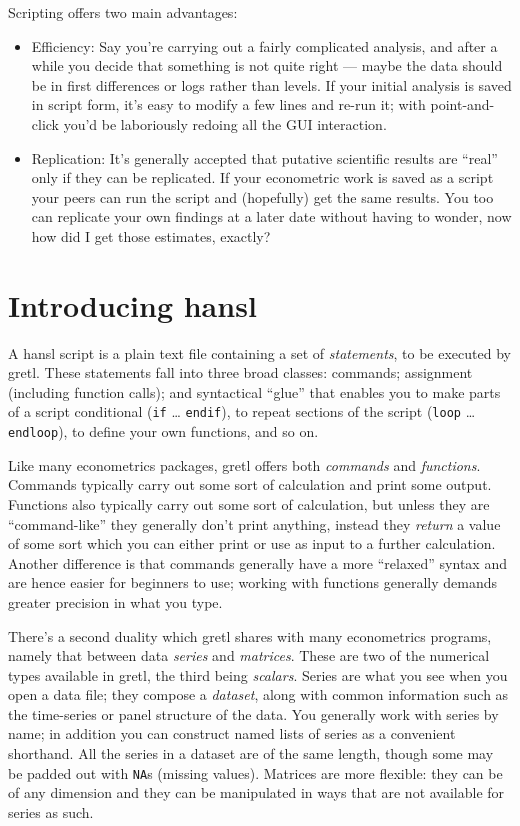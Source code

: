 Scripting offers two main advantages:

\begin{itemize}
\item Efficiency: Say you're carrying out a fairly complicated
  analysis, and after a while you decide that something is not quite
  right --- maybe the data should be in first differences or logs
  rather than levels. If your initial analysis is saved in script
  form, it's easy to modify a few lines and re-run it; with
  point-and-click you'd be laboriously redoing all the GUI
  interaction.
\item Replication: It's generally accepted that putative scientific
  results are ``real'' only if they can be replicated.  If your
  econometric work is saved as a script your peers can run the script
  and (hopefully) get the same results. You too can replicate your own
  findings at a later date without having to wonder, now how did I get
  those estimates, exactly?
\end{itemize}

\section{Introducing hansl}

A hansl script is a plain text file containing a set of
\textsl{statements}, to be executed by gretl. These statements fall
into three broad classes: commands; assignment (including function
calls); and syntactical ``glue'' that enables you to make parts of a
script conditional (\texttt{if} \dots{} \texttt{endif}), to repeat
sections of the script (\texttt{loop} \dots{} \texttt{endloop}), to
define your own functions, and so on.

Like many econometrics packages, gretl offers both \textsl{commands}
and \textsl{functions}. Commands typically carry out some sort of
calculation and print some output. Functions also typically carry out
some sort of calculation, but unless they are ``command-like'' they
generally don't print anything, instead they \textsl{return} a value
of some sort which you can either print or use as input to a further
calculation. Another difference is that commands generally have a more
``relaxed'' syntax and are hence easier for beginners to use; working
with functions generally demands greater precision in what you type.

There's a second duality which gretl shares with many econometrics
programs, namely that between data \textsl{series} and
\textsl{matrices}. These are two of the numerical types available in
gretl, the third being \textsl{scalars}. Series are what you see when
you open a data file; they compose a \textsl{dataset}, along with
common information such as the time-series or panel structure of the
data. You generally work with series by name; in addition you can
construct named lists of series as a convenient shorthand. All the
series in a dataset are of the same length, though some may be padded
out with \texttt{NA}s (missing values). Matrices are more flexible:
they can be of any dimension and they can be manipulated in 
ways that are not available for series as such.

